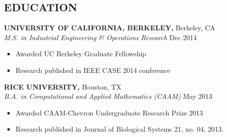\documentclass[geomargin]{res}
\begin{document}
\begin{resume}
\section{EDUCATION}
{\bf UNIVERSITY OF CALIFORNIA, BERKELEY,} Berkeley, CA \\
{\em M.S. in Industrial Engineering \& Operations Research }
\hfill Dec 2014\\                                     \vspace{-4mm}
\begin{itemize}
  \item Awarded UC Berkeley Graduate Fellowship
  \item Research published in IEEE CASE 2014 conference
\end{itemize}
\vspace{-1mm}

{\bf RICE UNIVERSITY,} Houston, TX \\
{\em B.A. in Computational and Applied Mathematics (CAAM)}
\hfill May 2013\\                                     \vspace{-4mm}
\begin{itemize}                                         \itemsep1pt
  \item Awarded CAAM-Chevron Undergraduate Research Prize 2013
  \item Research published in Journal of Biological Systems 21, no. 04, 2013.
\end{itemize}
\vspace{-1mm}







\end{resume}
\end{document}

